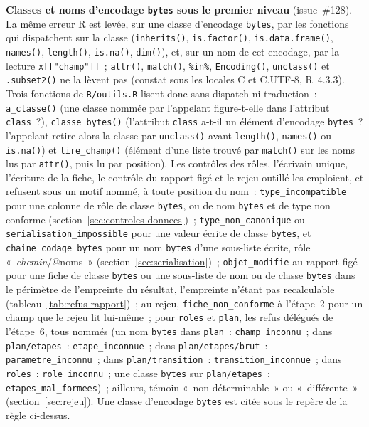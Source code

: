 \documentclass[a4paper,11pt]{article}
\newcommand{\code}[1]{\texttt{\small #1}}
\begin{document}
\medskip
\noindent
\textbf{Classes et noms d'encodage \code{bytes} sous le premier niveau}
(issue~\#128). La même erreur R est levée, sur une classe d'encodage
\code{bytes}, par les fonctions qui dispatchent sur la classe
(\code{inherits()}, \code{is.factor()}, \code{is.data.frame()},
\code{names()}, \code{length()}, \code{is.na()}, \code{dim()}), et, sur un
nom de cet encodage, par la lecture \code{x[["champ"]]}~; \code{attr()},
\code{match()}, \code{\%in\%}, \code{Encoding()}, \code{unclass()} et
\code{.subset2()} ne la lèvent pas (constat sous les locales C et
C.UTF-8, R~4.3.3). Trois fonctions de \code{R/outils.R} lisent donc sans
dispatch ni traduction~: \code{a\_classe()} (une classe nommée par
l'appelant figure-t-elle dans l'attribut \code{class}~?),
\code{classe\_bytes()} (l'attribut \code{class} a-t-il un élément
d'encodage \code{bytes}~? l'appelant retire alors la classe par
\code{unclass()} avant \code{length()}, \code{names()} ou \code{is.na()})
et \code{lire\_champ()} (élément d'une liste trouvé par \code{match()} sur
les noms lus par \code{attr()}, puis lu par position). Les contrôles des
rôles, l'écrivain unique, l'écriture de la fiche, le contrôle du rapport
figé et le rejeu outillé les emploient, et refusent sous un motif nommé, à
toute position du nom~: \code{type\_incompatible} pour une colonne de rôle
de classe \code{bytes}, ou de nom \code{bytes} et de type non conforme
(section~\ref{sec:controles-donnees})~; \code{type\_non\_canonique} ou
\code{serialisation\_impossible} pour une valeur écrite de classe
\code{bytes}, et \code{chaine\_codage\_bytes} pour un nom \code{bytes}
d'une sous-liste écrite, rôle «~\emph{chemin}/@noms~»
(section~\ref{sec:serialisation})~; \code{objet\_modifie} au rapport figé
pour une fiche de classe \code{bytes} ou une sous-liste de nom ou de classe
\code{bytes} dans le périmètre de l'empreinte du résultat, l'empreinte
n'étant pas recalculable (tableau~\ref{tab:refus-rapport})~; au rejeu,
\code{fiche\_non\_conforme} à l'étape~2 pour un champ que le rejeu lit
lui-même~; pour \code{roles} et \code{plan}, les refus délégués de
l'étape~6, tous nommés (un nom \code{bytes} dans \code{plan}~:
\code{champ\_inconnu}~; dans \code{plan/etapes}~:
\code{etape\_inconnue}~; dans \code{plan/etapes/brut}~:
\code{parametre\_inconnu}~; dans \code{plan/transition}~:
\code{transition\_inconnue}~; dans \code{roles}~: \code{role\_inconnu}~;
une classe \code{bytes} sur \code{plan/etapes}~:
\code{etapes\_mal\_formees})~; ailleurs, témoin «~non déterminable~» ou
«~différente~» (section~\ref{sec:rejeu}). Une classe d'encodage
\code{bytes} est citée sous le repère de la règle ci-dessus.
\end{document}
